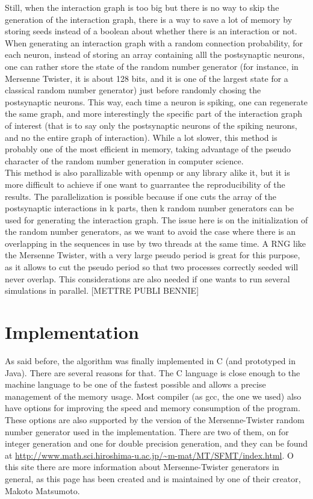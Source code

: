 	Still, when the interaction graph is too big but there is no way to skip the generation of the interaction graph, there is a way to save a lot of memory by storing seeds instead of a boolean about whether there is an interaction or not. When generating an interaction graph with a random connection probability, for each neuron, instead of storing an array containing alll the postsynaptic neurons, one can rather store the state of the random number generator (for instance, in Mersenne Twister, it is about 128 bits, and it is one of the largest state for a classical random number generator) just before randomly chosing the postsynaptic neurons. This way, each time a neuron is spiking, one can regenerate the same graph, and more interestingly the specific part of the interaction graph of interest (that is to say only the postsynaptic neurons of the spiking neurons, and no the entire graph of interaction). While a lot slower, this method is probably one of the most efficient in memory, taking advantage of the pseudo character of the random number generation in computer science.\\

	This method is also parallizable with openmp or any library alike it, but it is more difficult to achieve if one want to guarrantee the reproducibility of the results. The parallelization is possible because if one cuts the array of the postsynaptic interactions in k parts, then k random number generators can be used for generating the interaction graph. The issue here is on the initialization of the random number generators, as we want to avoid the case where there is an overlapping in the sequences in use by two threads at the same time. A RNG like the Mersenne Twister, with a very large pseudo period is great for this purpose, as it allows to cut the pseudo period so that two processes correctly seeded will never overlap. This considerations are also needed if one wants to run several simulations in parallel. [METTRE PUBLI BENNIE]

\section{Implementation}
	As said before, the algorithm was finally implemented in C (and prototyped in Java). There are several reasons for that. The C language is close enough to the machine language to be one of the fastest possible and allows a precise management of the memory usage. Most compiler (as gcc, the one we used) also have options for improving the speed and memory consumption of the program. These options are also supported by the version of the Mersenne-Twister random number generator used in the implementation. There are two of them, on for integer generation and one for double precision generation, and they can be found at \url{http://www.math.sci.hiroshima-u.ac.jp/~m-mat/MT/SFMT/index.html}. O this site there are more information about Mersenne-Twister generators in general, as this page has been created and is maintained by one of their creator, Makoto Matsumoto.\\

